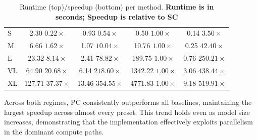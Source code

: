 \begin{table}[t]
\begin{minipage}{0.48\textwidth}
\begin{tabular}{l c c c c}
S  & \makecell{2.30 \\ $0.22\times$}
   & \makecell{0.93 \\ $0.54\times$}
   & \makecell{0.50 \\ $1.00\times$}
   & \makecell{0.14 \\ $3.50\times$} \\

M  & \makecell{6.66 \\ $1.62\times$}
   & \makecell{1.07 \\ $10.04\times$}
   & \makecell{10.76 \\ $1.00\times$}
   & \makecell{0.25 \\ $42.40\times$} \\

L  & \makecell{23.32 \\ $8.14\times$}
   & \makecell{2.41 \\ $78.82\times$}
   & \makecell{189.75 \\ $1.00\times$}
   & \makecell{0.76 \\ $250.21\times$} \\

VL & \makecell{64.90 \\ $20.68\times$}
   & \makecell{6.14 \\ $218.60\times$}
   & \makecell{1342.22 \\ $1.00\times$}
   & \makecell{3.06 \\ $438.44\times$} \\

XL & \makecell{127.71 \\ $37.37\times$}
   & \makecell{13.46 \\ $354.55\times$}
   & \makecell{4771.83 \\ $1.00\times$}
   & \makecell{9.18 \\ $519.91\times$} \\

\bottomrule
\end{tabular}
\end{minipage}

\caption{Runtime (top)/speedup (bottom) per method. \textbf{Runtime is in seconds; Speedup is relative to SC}}
\label{tab:model_configs}
\end{table}

Across both regimes, PC consistently outperforms all baselines, maintaining the largest speedup across almost every preset. This trend holds even as model size increases, demonstrating that the implementation effectively exploits parallelism in the dominant compute paths.

